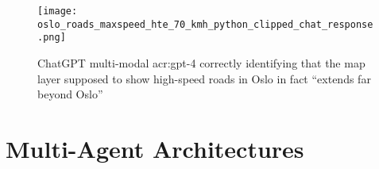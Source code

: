 \begin{figure}
    \centering
    \texttt{[image: oslo\_roads\_maxspeed\_hte\_70\_kmh\_python\_clipped\_chat\_response.png]}
    \caption{ChatGPT multi-modal \acrshort{acr:gpt}-4 correctly identifying that the map layer supposed to show high-speed roads in Oslo in fact \enquote{extends far beyond Oslo}}
    \label{fig:chatgpt-visual-self-verfication}
\end{figure}


\section{Multi-Agent Architectures}
\label{sec:multi-agent-architectures}